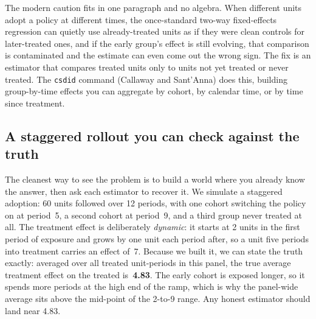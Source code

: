 \documentclass[
    a4paper,
    fontsize=10pt,
    twoside=true,
    numbers=noenddot,
]{kaobook}
\begin{document}
The modern caution fits in one paragraph and no algebra. When different units adopt a policy at different times, the once-standard two-way fixed-effects regression can quietly use already-treated units as if they were clean controls for later-treated ones, and if the early group's effect is still evolving, that comparison is contaminated and the estimate can even come out the wrong sign. The fix is an estimator that compares treated units only to units not yet treated or never treated. The \texttt{csdid} command (Callaway and Sant'Anna) does this, building group-by-time effects you can aggregate by cohort, by calendar time, or by time since treatment.

\subsection{A staggered rollout you can check against the truth}
The cleanest way to see the problem is to build a world where you already know the answer, then ask each estimator to recover it. We simulate a staggered adoption: 60 units followed over 12 periods, with one cohort switching the policy on at period~5, a second cohort at period~9, and a third group never treated at all. The treatment effect is deliberately \emph{dynamic}: it starts at 2 units in the first period of exposure and grows by one unit each period after, so a unit five periods into treatment carries an effect of~7. Because we built it, we can state the truth exactly: averaged over all treated unit-periods in this panel, the true average treatment effect on the treated is~\textbf{4.83}. The early cohort is exposed longer, so it spends more periods at the high end of the ramp, which is why the panel-wide average sits above the mid-point of the 2-to-9 range. Any honest estimator should land near 4.83.
\end{document}
